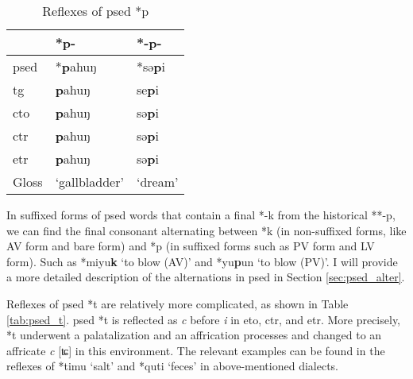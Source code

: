 \begin{table}[!htbp]
\centering
\caption{Reflexes of \acl{psed} *p}
\label{tab:psed_p}
\begin{tabular}{lll}
\hline
           & *p-    & *-p-  \\ \hline
\acs{psed} & *\textbf{p}ahuŋ & *sə\textbf{p}i \\ \hdashline
\acs{tg}   & \textbf{p}ahuŋ  & se\textbf{p}i  \\
\acs{cto}  & \textbf{p}ahuŋ  & sə\textbf{p}i  \\
\acs{ctr}  & \textbf{p}ahuŋ  & sə\textbf{p}i  \\
\acs{etr}  & \textbf{p}ahuŋ  & sə\textbf{p}i  \\ \hline
Gloss      & `gallbladder'   & `dream'        \\ \hline
\end{tabular}
\end{table}

In suffixed forms of \acl{psed} words that contain a final *-k from the historical **-p, we can find the final consonant alternating between *k (in non-suffixed forms, like AV form and bare form) and *p (in suffixed forms such as PV form and LV form). Such as *miyu\textbf{k} `to blow (AV)' and *yu\textbf{p}un `to blow (PV)'. I will provide a more detailed description of the alternations in \acl{psed} in Section \ref{sec:psed_alter}.

Reflexes of \acl{psed} *t are relatively more complicated, as shown in Table \ref{tab:psed_t}. \acl{psed} *t is reflected as \textit{c} before \textit{i} in \acs{eto}, \acs{ctr}, and \acs{etr}. More precisely, *t underwent a palatalization and an affrication processes and changed to an affricate \textit{c} [ʨ] in this environment. The relevant examples can be found in the reflexes of *timu `salt' and *quti `feces' in above-mentioned dialects. 

